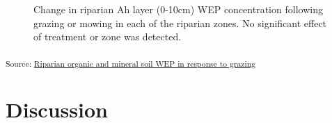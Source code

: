\documentclass[
]{agujournal2019}
\begin{document}
\begin{figure}[H]


\caption{\label{fig-soil-wep}Change in riparian Ah layer (0-10cm) WEP
concentration following grazing or mowing in each of the riparian zones.
No significant effect of treatment or zone was detected.}

\end{figure}%

\textsubscript{Source:
\href{https://alex-koiter.github.io/riparian-grazing-manuscript/notebooks/03_Soils_analysis-preview.html\#cell-fig-soil-WEP}{Riparian
organic and mineral soil WEP in response to grazing}}

\section{Discussion}\label{discussion}
\end{document}

